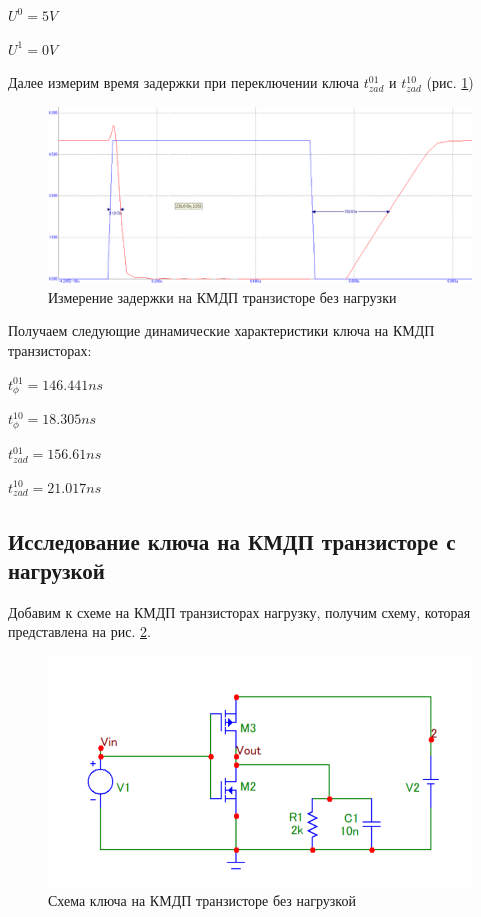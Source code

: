 \documentclass[a4paper,14pt]{article}
\begin{document}
$U^0 = 5V$

$U^1 = 0V$

Далее измерим время задержки при переключении ключа $t^{01}_{zad}$ и $t^{10}_{zad}$ (рис. \ref{fig:kmdpgrafzad})

\begin{figure}[H]
	\centering
	\includegraphics[width=0.7\linewidth]{image/KMDP_graf_zad}
	\caption{Измерение задержки на КМДП транзисторе без нагрузки}
	\label{fig:kmdpgrafzad}
\end{figure}

Получаем следующие динамические характеристики ключа на КМДП транзисторах:

$t^{01}_{\phi} = 146.441ns$

$t^{10}_{\phi} = 18.305ns$

$t^{01}_{zad} = 156.61ns$

$t^{10}_{zad} = 21.017ns$



\subsection{Исследование ключа на КМДП транзисторе с нагрузкой}

Добавим к схеме на КМДП транзисторах нагрузку, получим схему, которая представлена на рис. \ref{fig:kmdpshnagr}.

\begin{figure}[H]
	\centering
	\includegraphics[width=0.7\linewidth]{image/KMDP_sh_nagr}
	\caption{Схема ключа на КМДП транзисторе без нагрузкой}
	\label{fig:kmdpshnagr}
\end{figure}
\end{document}
